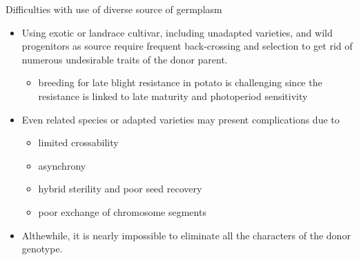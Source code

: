 \documentclass[11pt,dvipsnames,ignorenonframetext,aspectratio=169]{beamer}
\providecommand{\tightlist}{%
  \setlength{\itemsep}{0pt}\setlength{\parskip}{0pt}}
\begin{document}
\begin{frame}{Difficulties with use of diverse source of germplasm}
\protect\hypertarget{difficulties-with-use-of-diverse-source-of-germplasm}{}
\begin{itemize}
\tightlist
\item
  Using exotic or landrace cultivar, including unadapted varieties, and
  wild progenitors as source require frequent back-crossing and
  selection to get rid of numerous undesirable traits of the donor
  parent.

  \begin{itemize}
  \tightlist
  \item
    breeding for late blight resistance in potato is challenging since
    the resistance is linked to late maturity and photoperiod
    sensitivity
  \end{itemize}
\item
  Even related species or adapted varieties may present complications
  due to

  \begin{itemize}
  \tightlist
  \item
    limited crossability
  \item
    asynchrony
  \item
    hybrid sterility and poor seed recovery
  \item
    poor exchange of chromosome segments
  \end{itemize}
\item
  Althewhile, it is nearly impossible to eliminate all the characters of
  the donor genotype.
\end{itemize}
\end{frame}
\end{document}

